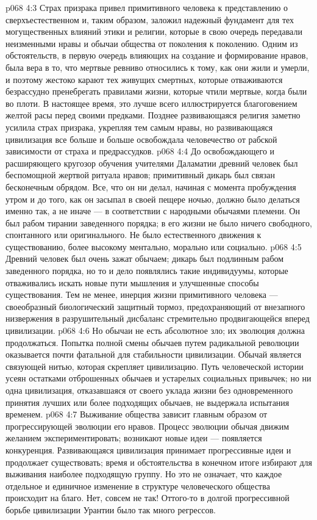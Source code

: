 \vs p068 4:3 \pc Страх призрака привел примитивного человека к представлению о сверхъестественном и, таким образом, заложил надежный фундамент для тех могущественных влияний этики и религии, которые в свою очередь передавали неизменными нравы и обычаи общества от поколения к поколению. Одним из обстоятельств, в первую очередь влияющих на создание и формирование нравов, была вера в то, что мертвые ревниво относились к тому, как они жили и умерли, и поэтому жестоко карают тех живущих смертных, которые отваживаются безрассудно пренебрегать правилами жизни, которые чтили мертвые, когда были во плоти. В настоящее время, это лучше всего иллюстрируется благоговением желтой расы перед своими предками. Позднее развивающаяся религия заметно усилила страх призрака, укрепляя тем самым нравы, но развивающаяся цивилизация все больше и больше освобождала человечество от рабской зависимости от страха и предрассудков.
\vs p068 4:4 До освобождающего и расширяющего кругозор обучения учителями Даламатии древний человек был беспомощной жертвой ритуала нравов; примитивный дикарь был связан бесконечным обрядом. Все, что он ни делал, начиная с момента пробуждения утром и до того, как он засыпал в своей пещере ночью, должно было делаться именно так, а не иначе --- в соответствии с народными обычаями племени. Он был рабом тирании заведенного порядка; в его жизни не было ничего свободного, спонтанного или оригинального. Не было естественного движения к существованию, более высокому ментально, морально или социально.
\vs p068 4:5 Древний человек был очень зажат обычаем; дикарь был подлинным рабом заведенного порядка, но то и дело появлялись такие индивидуумы, которые отваживались искать новые пути мышления и улучшенные способы существования. Тем не менее, инерция жизни примитивного человека --- своеобразный биологический защитный тормоз, предохраняющий от внезапного низвержения в разрушительный дисбаланс стремительно продвигающейся вперед цивилизации.
\vs p068 4:6 Но обычаи не есть абсолютное зло; их эволюция должна продолжаться. Попытка полной смены обычаев путем радикальной революции оказывается почти фатальной для стабильности цивилизации. Обычай является связующей нитью, которая скрепляет цивилизацию. Путь человеческой истории усеян остатками отброшенных обычаев и устарелых социальных привычек; но ни одна цивилизация, отказавшаяся от своего уклада жизни без одновременного принятия лучших или более подходящих обычаев, не выдержала испытания временем.
\vs p068 4:7 Выживание общества зависит главным образом от прогрессирующей эволюции его нравов. Процесс эволюции обычая движим желанием экспериментировать; возникают новые идеи --- появляется конкуренция. Развивающаяся цивилизация принимает прогрессивные идеи и продолжает существовать; время и обстоятельства в конечном итоге избирают для выживания наиболее подходящую группу. Но это не означает, что каждое отдельное и единичное изменение в структуре человеческого общества происходит на благо. Нет, совсем не так! Оттого\hyp{}то в долгой прогрессивной борьбе цивилизации Урантии было так много регрессов.
